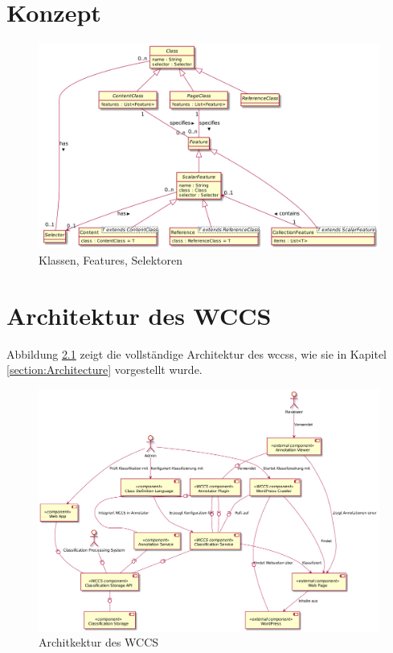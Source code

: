 \chapter{Konzept}
    \begin{figure}[htb]
        \centering
        \includegraphics[width=\textwidth]{../resources/concept/classes-features-selectors.png}
        \caption{Klassen, Features, Selektoren}
        \label{image:conceptClassesFeaturesSelectors}
    \end{figure}

\chapter{Architektur des WCCS}
    Abbildung \ref{image:wccsCompleteArchitecture} zeigt die vollständige Architektur des \glspl{wccs},
    wie sie in Kapitel \ref{section:Architecture} vorgestellt wurde.

    \begin{figure}[htb]
        \centering
        \includegraphics[width=\textwidth]{../resources/architecture/complete_architecture.png}
        \caption{Architkektur des WCCS}
        \label{image:wccsCompleteArchitecture}
    \end{figure}

